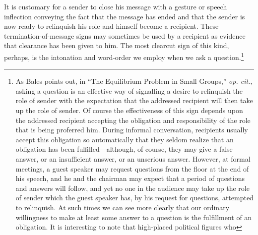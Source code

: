 \documentclass[twoside,symmetric,nobib,justified]{tufte-book}
\begin{document}
It is customary for a sender to close his message with a gesture or
speech inflection conveying the fact that the message has ended and that
the sender is now ready to relinquish his role and himself become a
recipient. These termination-of-message signs may sometimes be used by a
recipient as evidence that clearance has been given to him. The most
clearcut sign of this kind, perhaps, is the intonation and word-order we
employ when we ask a question.\footnote{As Bales points out, in ``The
  Equilibrium Problem in Small Groups,'' \emph{op. cit.}, asking a
  question is an effective way of signalling a desire to
  relinquish the role of sender with the expectation that the addressed
  recipient will then take up the role of sender. Of course the
  effectiveness of this sign depends upon the addressed recipient
  accepting the obligation and responsibility of the role that is being
  proferred him. During informal conversation, recipients usually accept
  this obligation so automatically that they seldom realize that an
  obligation has been fulfilled---although, of course, they may give a
  false answer, or an insufficient answer, or an unserious answer.
  However, at formal meetings, a guest speaker may request questions
  from the floor at the end of his speech, and he and the chairman may
  expect that a period of questions and answers will follow, and yet no
  one in the audience may take up the role of sender which the guest
  speaker has, by his request for questions, attempted to relinquish. At
  such times we can see more clearly that our ordinary willingness to
  make at least some answer to a question is the fulfillment of an
  obligation. It is interesting to note that high-placed political figures who}
\end{document}
